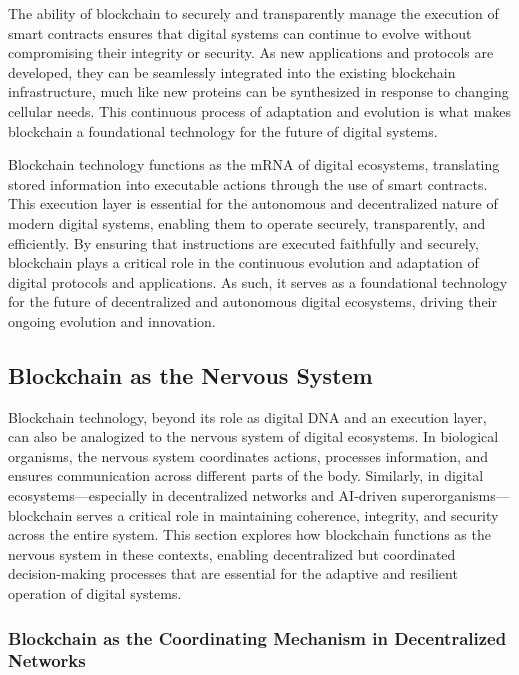 \documentclass[12pt,twoside]{article}
\begin{document}
The ability of blockchain to securely and transparently manage the execution of smart contracts ensures that digital systems can continue to evolve without compromising their integrity or security. As new applications and protocols are developed, they can be seamlessly integrated into the existing blockchain infrastructure, much like new proteins can be synthesized in response to changing cellular needs. This continuous process of adaptation and evolution is what makes blockchain a foundational technology for the future of digital systems.

Blockchain technology functions as the mRNA of digital ecosystems, translating stored information into executable actions through the use of smart contracts. This execution layer is essential for the autonomous and decentralized nature of modern digital systems, enabling them to operate securely, transparently, and efficiently. By ensuring that instructions are executed faithfully and securely, blockchain plays a critical role in the continuous evolution and adaptation of digital protocols and applications. As such, it serves as a foundational technology for the future of decentralized and autonomous digital ecosystems, driving their ongoing evolution and innovation.


\subsection{Blockchain as the Nervous System}

Blockchain technology, beyond its role as digital DNA and an execution layer, can also be analogized to the nervous system of digital ecosystems. In biological organisms, the nervous system coordinates actions, processes information, and ensures communication across different parts of the body. Similarly, in digital ecosystems—especially in decentralized networks and AI-driven superorganisms—blockchain serves a critical role in maintaining coherence, integrity, and security across the entire system. This section explores how blockchain functions as the nervous system in these contexts, enabling decentralized but coordinated decision-making processes that are essential for the adaptive and resilient operation of digital systems.

\subsubsection{Blockchain as the Coordinating Mechanism in Decentralized Networks}
\end{document}
